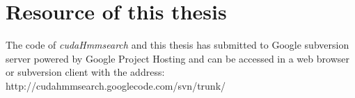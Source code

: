 
\chapter{Resource of this thesis} %

\label{AppendixA} %


The code of \emph{cudaHmmsearch} and this thesis has submitted to Google subversion server powered by Google Project Hosting and can be accessed in a web browser or subversion client with the address:
http://cudahmmsearch.googlecode.com/svn/trunk/